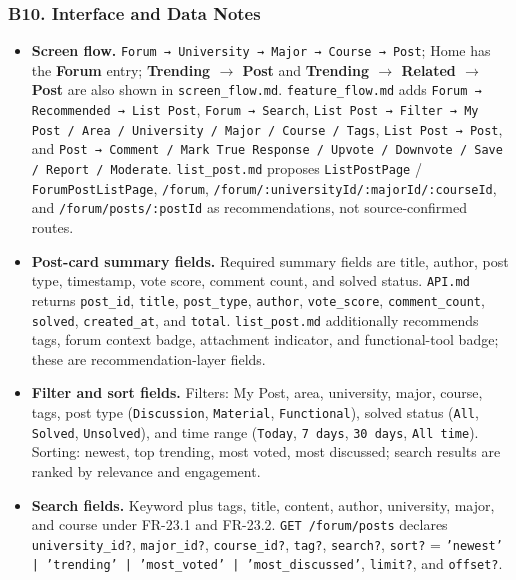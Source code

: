 \documentclass[12pt]{article}
\begin{document}
\hypertarget{sec:b10-interface-and-data-notes}{}
\subsubsection*{B10. Interface and Data Notes}
\par\medskip

\begin{itemize}
\item \textbf{Screen flow.} \texttt{Forum → University → Major → Course → Post}; Home has the \textbf{Forum} entry; \textbf{Trending $\rightarrow$ Post} and \textbf{Trending $\rightarrow$ Related $\rightarrow$ Post} are also shown in \texttt{screen\_flow.md}. \texttt{feature\_flow.md} adds \texttt{Forum → Recommended → List Post}, \texttt{Forum → Search}, \texttt{List Post → Filter → My Post / Area / University / Major / Course / Tags}, \texttt{List Post → Post}, and \texttt{Post → Comment / Mark True Response / Upvote / Downvote / Save / Report / Moderate}. \texttt{list\_post.md} proposes \texttt{ListPostPage} / \texttt{ForumPostListPage}, \texttt{/forum}, \texttt{/forum/:universityId/:majorId/:courseId}, and \texttt{/forum/posts/:postId} as recommendations, not source-confirmed routes.
\item \textbf{Post-card summary fields.} Required summary fields are title, author, post type, timestamp, vote score, comment count, and solved status. \texttt{API.md} returns \texttt{post\_id}, \texttt{title}, \texttt{post\_type}, \texttt{author}, \texttt{vote\_score}, \texttt{comment\_count}, \texttt{solved}, \texttt{created\_at}, and \texttt{total}. \texttt{list\_post.md} additionally recommends tags, forum context badge, attachment indicator, and functional-tool badge; these are recommendation-layer fields.
\item \textbf{Filter and sort fields.} Filters: My Post, area, university, major, course, tags, post type (\texttt{Discussion}, \texttt{Material}, \texttt{Functional}), solved status (\texttt{All}, \texttt{Solved}, \texttt{Unsolved}), and time range (\texttt{Today}, \texttt{7 days}, \texttt{30 days}, \texttt{All time}). Sorting: newest, top trending, most voted, most discussed; search results are ranked by relevance and engagement.
\item \textbf{Search fields.} Keyword plus tags, title, content, author, university, major, and course under FR-23.1 and FR-23.2. \texttt{GET /forum/posts} declares \texttt{university\_id?}, \texttt{major\_id?}, \texttt{course\_id?}, \texttt{tag?}, \texttt{search?}, \texttt{sort?} = \texttt{'newest' | 'trending' | 'most\_voted' | 'most\_discussed'}, \texttt{limit?}, and \texttt{offset?}.

\end{itemize}
\end{document}
